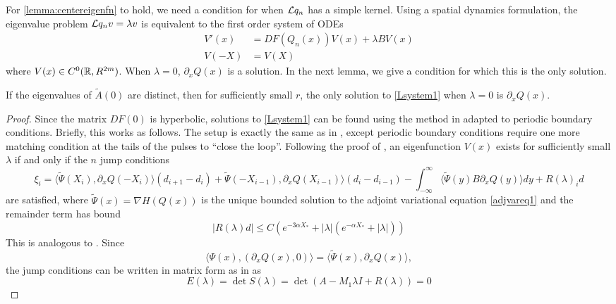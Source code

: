 \documentclass[thesis.tex]{subfiles}
\begin{document}
For \cref{lemma:centereigenfn} to hold, we need a condition for when $\mathcal{L}{q_n}$ has a simple kernel. Using a spatial dynamics formulation, the eigenvalue problem $\mathcal{L}{q_n}v = \lambda v$ is equivalent to the first order system of ODEs 
\begin{equation}\label{Lsystem1}
\begin{aligned}
V'(x) &= DF(Q_n(x))V(x) + \lambda B V(x) \\
V(-X) &= V(X)
\end{aligned}
\end{equation}
where $V(x) \in C^0(\mathbb{R}, R^{2m})$. When $\lambda = 0$, $\partial_x Q(x)$ is a solution. In the next lemma, we give a condition for which this is the only solution.

\begin{lemma}\label{Lsystemeigs}
If the eigenvalues of $\tilde{A}(0)$ are distinct, then for sufficiently small $r$, the only solution to \cref{Lsystem1} when $\lambda = 0$ is $\partial_x Q(x)$.
\begin{proof}
Since the matrix $DF(0)$ is hyperbolic, solutions to \cref{Lsystem1} can be found using the method in \cite{Sandstede1998} adapted to periodic boundary conditions. Briefly, this works as follows. The setup is exactly the same as in \cite{Sandstede1998}, except periodic boundary conditions require one more matching condition at the tails of the pulses to ``close the loop''. Following the proof of \cite[Theorem 2]{Sandstede1998}, an eigenfunction $V(x)$ exists for sufficiently small $\lambda$ if and only if the $n$ jump conditions
\[
\xi_i = \langle \tilde{\Psi}(X_i), \partial_x Q(-X_i) \rangle (d_{i+1} - d_i) + \tilde{\Psi}(-X_{i-1}), \partial_x Q(X_{i-1}) \rangle (d_i - d_{i-1}) - \int_{-\infty}^\infty \langle \tilde{\Psi}(y) B \partial_x Q(y) \rangle dy + R(\lambda)_i d
\]
are satisfied, where $\tilde{\Psi}(x) = \nabla H(Q(x))$ is the unique bounded solution to the adjoint variational equation \cref{adjvareq1} and the remainder term has bound
\[
|R(\lambda)d| \leq C \left( e^{-3 \alpha X_*} + |\lambda|(e^{-\alpha X_*} + |\lambda| ) \right)
\]
This is analogous to \cite[(3.56)]{Sandstede1998}. Since 
\begin{equation*}
\langle \Psi(x), (\partial_x Q(x), 0) \rangle = \langle \tilde{\Psi}(x), \partial_x Q(x) \rangle,
\end{equation*}
the jump conditions  can be written in matrix form as in \cite[Theorem 2]{Sandstede1998} as
\begin{equation}\label{Ljumps}
E(\lambda) = \det S(\lambda) = \det( A - M_1 \lambda I + R(\lambda)) = 0

\end{equation}
\end{proof}
\end{lemma}
\end{document}
